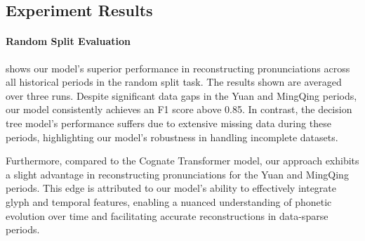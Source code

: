 

\subsection{Experiment Results}

\paragraph{Random Split Evaluation}

 shows our model's superior performance in reconstructing pronunciations across all historical periods in the random split task. The results shown are averaged over three runs. Despite significant data gaps in the Yuan and MingQing periods, our model consistently achieves an F1 score above 0.85. In contrast, the decision tree model's performance suffers due to extensive missing data during these periods, highlighting our model's robustness in handling incomplete datasets.

Furthermore, compared to the Cognate Transformer model, our approach exhibits a slight advantage in reconstructing pronunciations for the Yuan and MingQing periods. This edge is attributed to our model's ability to effectively integrate glyph and temporal features, enabling a nuanced understanding of phonetic evolution over time and facilitating accurate reconstructions in data-sparse periods.

